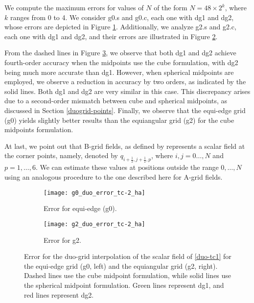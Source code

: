 We compute the maximum errors for values of $N$ of the form $N=48\times2^k$, where $k$ ranges from 0 to 4. 
We consider g0.s and g0.c, each one with dg1 and dg2, whose errors are depicted in Figure \ref{cs-duoscalar-tc1-g0}.
Additionally, we analyze g2.s and g2.c, each one with dg1 and dg2, and their errors are illustrated in Figure \ref{cs-duoscalar-tc1-g2}.

From the dashed lines in Figure \ref{cs-tc1-error}, we observe that both dg1 and dg2 achieve fourth-order accuracy when the midpoints use the cube formulation, 
with dg2 being much more accurate than dg1.
However, when spherical midpoints are employed, we observe a reduction in accuracy by two orders, as indicated by the solid lines.
Both dg1 and dg2 are very similar in this case.
This discrepancy arises due to a second-order mismatch between cube and spherical midpoints, as discussed in Section \ref{duogrid-points}.
Finally, we observe that the equi-edge grid (g0) yields slightly better results than the equiangular grid (g2) for the cube midpoints formulation.

At last, we point out that B-grid fields, as defined by \cite{arakawa:1977} represents a scalar field
at the corner points, namely, 
denoted by $q_{i+\frac{1}{2},j+\frac{1}{2},p}$, where $i, j=0\ldots, N$ and $p=1,\ldots, 6$. 
We can estimate these values at positions outside the range $0, \ldots, N$ using an analogous procedure to the one described here for A-grid fields.

\begin{figure}[!htb]
	\centering
	\begin{subfigure}{0.45\textwidth}
		\centering
		\texttt{[image: g0\_duo\_error\_tc-2\_ha]}
		\caption{Error for equi-edge (g0).\label{cs-duoscalar-tc1-g0}}
	\end{subfigure}
	\begin{subfigure}{0.45\textwidth}
		\centering
		\texttt{[image: g2\_duo\_error\_tc-2\_ha]}
		\caption{Error for g2.\label{cs-duoscalar-tc1-g2}}
	\end{subfigure}
	\caption{Error for the duo-grid interpolation of the scalar field of \eqref{duo-tc1} for the equi-edge grid (g0, left) and the equiangular grid (g2, right).
Dashed lines use the cube midpoint formulation, while solid lines use the spherical midpoint formulation.
Green lines represent dg1, and red lines represent dg2.\label{cs-tc1-error}}
\end{figure}


